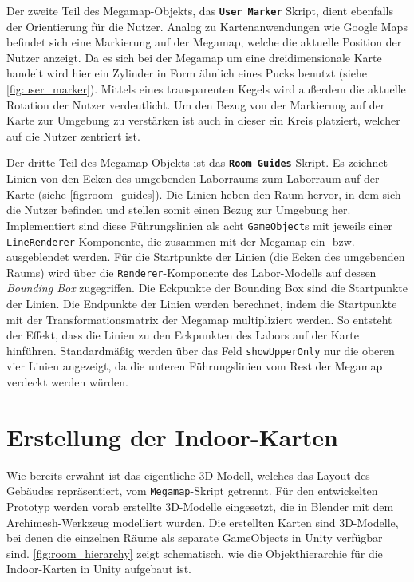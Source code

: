 Der zweite Teil des Megamap-Objekts, das \textbf{\lstinline|User Marker|} Skript, dient ebenfalls der Orientierung für die Nutzer.
Analog zu Kartenanwendungen wie Google Maps befindet sich eine Markierung auf der Megamap, welche die aktuelle Position der Nutzer anzeigt.
Da es sich bei der Megamap um eine dreidimensionale Karte handelt wird hier ein Zylinder in Form ähnlich eines Pucks benutzt (siehe \autoref{fig:user_marker}).
Mittels eines transparenten Kegels wird außerdem die aktuelle Rotation der Nutzer verdeutlicht.
Um den Bezug von der Markierung auf der Karte zur Umgebung zu verstärken ist auch in dieser ein Kreis platziert, welcher auf die Nutzer zentriert ist.

Der dritte Teil des Megamap-Objekts ist das \textbf{\lstinline|Room Guides|} Skript.
Es zeichnet Linien von den Ecken des umgebenden Laborraums zum Laborraum auf der Karte (siehe \autoref{fig:room_guides}).
Die Linien heben den Raum hervor, in dem sich die Nutzer befinden und stellen somit einen Bezug zur Umgebung her.
Implementiert sind diese Führungslinien als acht \lstinline|GameObject|s mit jeweils einer \lstinline|LineRenderer|-Komponente, die zusammen mit der Megamap ein- bzw. ausgeblendet werden.
Für die Startpunkte der Linien (die Ecken des umgebenden Raums) wird über die \lstinline|Renderer|-Komponente des Labor-Modells auf dessen \emph{Bounding Box} zugegriffen.
Die Eckpunkte der Bounding Box sind die Startpunkte der Linien.
Die Endpunkte der Linien werden berechnet, indem die Startpunkte mit der Transformationsmatrix der Megamap multipliziert werden.
So entsteht der Effekt, dass die Linien zu den Eckpunkten des Labors auf der Karte hinführen.
Standardmäßig werden über das Feld \lstinline|showUpperOnly| nur die oberen vier Linien angezeigt, da die unteren Führungslinien vom Rest der Megamap verdeckt werden würden.

\section{Erstellung der Indoor-Karten}
\label{sec:indoor_maps}
Wie bereits erwähnt ist das eigentliche 3D-Modell, welches das Layout des Gebäudes repräsentiert, vom \lstinline|Megamap|-Skript getrennt.
Für den entwickelten Prototyp werden vorab erstellte 3D-Modelle eingesetzt, die in Blender mit dem Archimesh-Werkzeug modelliert wurden.
Die erstellten Karten sind 3D-Modelle, bei denen die einzelnen Räume als separate GameObjects in Unity verfügbar sind.
\autoref{fig:room_hierarchy} zeigt schematisch, wie die Objekthierarchie für die Indoor-Karten in Unity aufgebaut ist.


